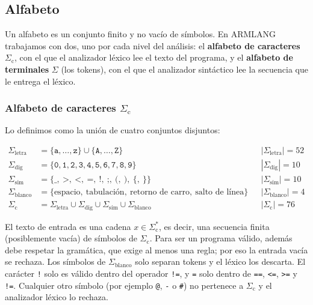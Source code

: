 \documentclass[10pt,a4paper]{article}
\newcommand{\tm}[1]{\texttt{#1}}                                          %
\begin{document}
\subsection{Alfabeto}
\label{sec:alfabeto}

Un alfabeto es un conjunto finito y no vacío de símbolos. En ARMLANG trabajamos con dos,
uno por cada nivel del análisis: el \textbf{alfabeto de caracteres} $\Sigma_{\mathrm{c}}$, con el
que el analizador léxico lee el texto del programa, y el \textbf{alfabeto de terminales}
$\Sigma$ (los tokens), con el que el analizador sintáctico lee la secuencia que le entrega el léxico.

\subsubsection*{Alfabeto de caracteres $\Sigma_{\mathrm{c}}$}

Lo definimos como la unión de cuatro conjuntos disjuntos:

\begin{align*}
\Sigma_{\text{letra}} &= \{\texttt{a},\ldots,\texttt{z}\} \cup \{\texttt{A},\ldots,\texttt{Z}\} && |\Sigma_{\text{letra}}| = 52\\
\Sigma_{\text{dig}}   &= \{\texttt{0},\texttt{1},\texttt{2},\texttt{3},\texttt{4},\texttt{5},\texttt{6},\texttt{7},\texttt{8},\texttt{9}\} && |\Sigma_{\text{dig}}| = 10\\
\Sigma_{\text{sim}}   &= \{\texttt{\_},\ \texttt{>},\ \texttt{<},\ \texttt{=},\ \texttt{!},\ \texttt{;},\ \texttt{(},\ \texttt{)},\ \texttt{\{},\ \texttt{\}}\} && |\Sigma_{\text{sim}}| = 10\\
\Sigma_{\text{blanco}} &= \{\text{espacio},\ \text{tabulación},\ \text{retorno de carro},\ \text{salto de línea}\} && |\Sigma_{\text{blanco}}| = 4\\[2pt]
\Sigma_{\mathrm{c}} &= \Sigma_{\text{letra}} \cup \Sigma_{\text{dig}} \cup \Sigma_{\text{sim}} \cup \Sigma_{\text{blanco}} && |\Sigma_{\mathrm{c}}| = 76
\end{align*}

El texto de entrada es una cadena $x \in \Sigma_{\mathrm{c}}^{*}$, es decir, una secuencia finita
(posiblemente vacía) de símbolos de $\Sigma_{\mathrm{c}}$. Para ser un programa válido, además debe
respetar la gramática, que exige al menos una regla; por eso la entrada vacía se rechaza. Los símbolos de $\Sigma_{\text{blanco}}$
solo separan tokens y el léxico los descarta. El carácter \tm{!} solo es válido dentro del operador
\tm{!=}, y \tm{=} solo dentro de \tm{==}, \tm{<=}, \tm{>=} y \tm{!=}. Cualquier otro símbolo
(por ejemplo \tm{@}, \tm{-} o \tm{\#}) no pertenece a $\Sigma_{\mathrm{c}}$ y el analizador léxico lo rechaza.
\end{document}
